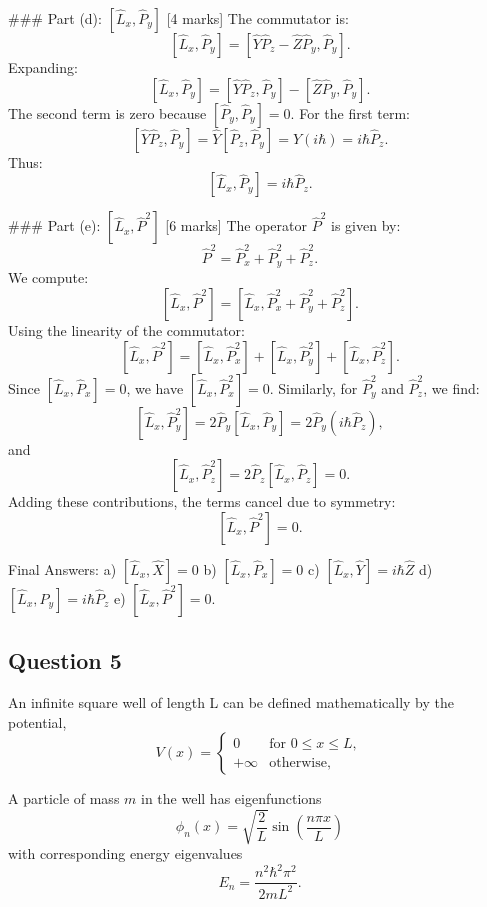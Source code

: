 \documentclass{article}
\begin{document}
### Part (d): \(\left[\hat{L}_x, \hat{P}_y\right]\) [4 marks]
The commutator is:
\[
\left[\hat{L}_x, \hat{P}_y\right] = \left[\hat{Y}\hat{P}_z - \hat{Z}\hat{P}_y, \hat{P}_y\right].
\]
Expanding:
\[
\left[\hat{L}_x, \hat{P}_y\right] = \left[\hat{Y}\hat{P}_z, \hat{P}_y\right] - \left[\hat{Z}\hat{P}_y, \hat{P}_y\right].
\]
The second term is zero because \(\left[\hat{P}_y, \hat{P}_y\right] = 0\). For the first term:
\[
\left[\hat{Y}\hat{P}_z, \hat{P}_y\right] = \hat{Y}\left[\hat{P}_z, \hat{P}_y\right] = \hat{Y}(i\hbar) = i\hbar\hat{P}_z.
\]
Thus:
\[
\left[\hat{L}_x, \hat{P}_y\right] = i\hbar\hat{P}_z.
\]

### Part (e): \(\left[\hat{L}_x, \hat{P}^2\right]\) [6 marks]
The operator \(\hat{P}^2\) is given by:
\[
\hat{P}^2 = \hat{P}_x^2 + \hat{P}_y^2 + \hat{P}_z^2.
\]
We compute:
\[
\left[\hat{L}_x, \hat{P}^2\right] = \left[\hat{L}_x, \hat{P}_x^2 + \hat{P}_y^2 + \hat{P}_z^2\right].
\]
Using the linearity of the commutator:
\[
\left[\hat{L}_x, \hat{P}^2\right] = \left[\hat{L}_x, \hat{P}_x^2\right] + \left[\hat{L}_x, \hat{P}_y^2\right] + \left[\hat{L}_x, \hat{P}_z^2\right].
\]
Since \(\left[\hat{L}_x, \hat{P}_x\right] = 0\), we have \(\left[\hat{L}_x, \hat{P}_x^2\right] = 0\). Similarly, for \(\hat{P}_y^2\) and \(\hat{P}_z^2\), we find:
\[
\left[\hat{L}_x, \hat{P}_y^2\right] = 2\hat{P}_y\left[\hat{L}_x, \hat{P}_y\right] = 2\hat{P}_y(i\hbar\hat{P}_z),
\]
and
\[
\left[\hat{L}_x, \hat{P}_z^2\right] = 2\hat{P}_z\left[\hat{L}_x, \hat{P}_z\right] = 0.
\]
Adding these contributions, the terms cancel due to symmetry:
\[
\left[\hat{L}_x, \hat{P}^2\right] = 0.
\]

Final Answers:
a) \(\left[\hat{L}_x, \hat{X}\right] = 0\)  
b) \(\left[\hat{L}_x, \hat{P}_x\right] = 0\)  
c) \(\left[\hat{L}_x, \hat{Y}\right] = i\hbar\hat{Z}\)  
d) \(\left[\hat{L}_x, \hat{P}_y\right] = i\hbar\hat{P}_z\)  
e) \(\left[\hat{L}_x, \hat{P}^2\right] = 0\).


 \subsection{Question 5}
An infinite square well of length L can be defined mathematically by the potential,
\[
V(x) = 
\begin{cases} 
0 & \text{for } 0 \leq x \leq L, \\
+\infty & \text{otherwise},
\end{cases}
\]

A particle of mass \(m\) in the well has eigenfunctions
\[
\phi_n(x) = \sqrt{\frac{2}{L}} \sin\left(\frac{n \pi x}{L}\right)
\]
with corresponding energy eigenvalues
\[
E_n = \frac{n^2 \hbar^2 \pi^2}{2mL^2}.
\]
\end{document}
